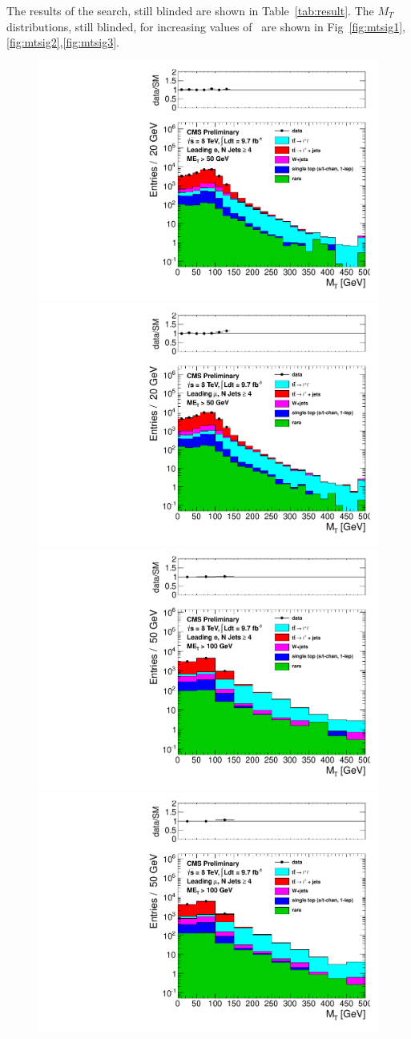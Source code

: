 
The results of the search, still blinded are shown in Table~\ref{tab:result}.
The $M_T$ distributions, still blinded, for increasing values of \met\
are shown in Fig~\ref{fig:mtsig1},\ref{fig:mtsig2},\ref{fig:mtsig3}.




\begin{figure}[hbt]
  \begin{center}
        \includegraphics[width=0.5\linewidth]{plots/mt_met50_ele.pdf}%
        \includegraphics[width=0.5\linewidth]{plots/mt_met50_muo.pdf}
        \includegraphics[width=0.5\linewidth]{plots/mt_met100_ele.pdf}%
        \includegraphics[width=0.5\linewidth]{plots/mt_met100_muo.pdf}

\end{center}
\end{figure}
